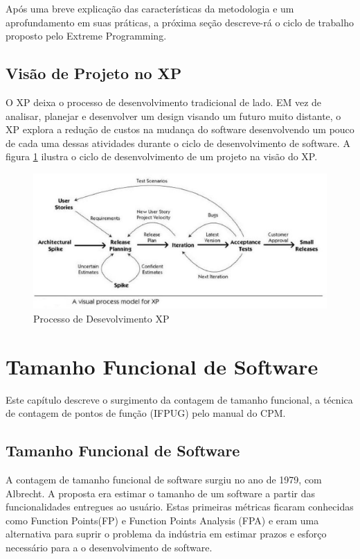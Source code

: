 Após uma breve explicação das características da metodologia e um aprofundamento em suas práticas, a próxima seção descreve-rá o ciclo de trabalho proposto pelo Extreme Programming.

\section{Visão de Projeto no XP}

O XP deixa o processo de desenvolvimento tradicional de lado. EM vez de analisar, planejar e desenvolver um design visando um futuro muito distante, o XP explora a redução de custos na mudança do software desenvolvendo um pouco de cada uma dessas atividades durante o ciclo de desenvolvimento de software. \cite{Beck:1999} A figura \ref{fig03} ilustra o ciclo de desenvolvimento de um projeto na visão do XP.

\begin{figure}[h]
	\centering
		\includegraphics[keepaspectratio=true,scale=0.9]{figuras/fig03.eps}
	\caption{Processo de Desevolvimento XP \cite{Process}}
	\label{fig03}
\end{figure}




\chapter[Tamanho Funcional de Software]{Tamanho Funcional de Software}

Este capítulo descreve o surgimento da contagem de tamanho funcional, a técnica de contagem de pontos de função (IFPUG) pelo manual do CPM.

\section{Tamanho Funcional de Software}

A contagem de tamanho funcional de software surgiu no ano de 1979, com Albrecht. A proposta era estimar o tamanho de um software a partir das funcionalidades entregues ao usuário. Estas primeiras métricas ficaram conhecidas como Function Points(FP)  e  Function Points Analysis (FPA)  e eram uma alternativa para suprir o problema da indústria em estimar prazos e esforço necessário para a o desenvolvimento de software.


